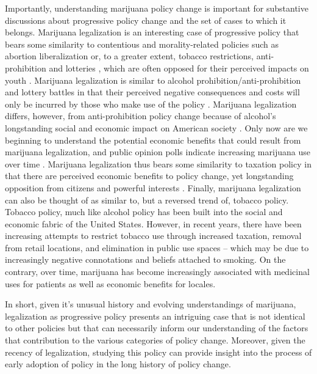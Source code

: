 Importantly, understanding marijuana policy change is important for substantive discussions about progressive policy change and the set of cases to which it belongs. Marijuana legalization is an interesting case of progressive policy that bears some similarity to  contentious and morality-related policies such as abortion liberalization or, to a greater extent, tobacco restrictions, anti-prohibition \citep{gusfield_1963,andrews_and_seguin_2015} and lotteries \citep{pierce_and_miller_1999,berry_and_berry_1990}, which are often opposed for their perceived impacts on youth \citep{beisel_1997}. Marijuana legalization is similar to alcohol prohibition/anti-prohibition and lottery battles in that their perceived negative consequences and costs will only be incurred by those who make use of the policy \citep{mikesell_and_zorn_1986,berry_and_berry_1990}. Marijuana legalization differs, however, from anti-prohibition policy change because of alcohol's longstanding social and economic impact on American society \citep{andrews_and_seguin_2015}. Only now are we beginning to understand the potential economic benefits that could result from marijuana legalization, and public opinion polls indicate increasing marijuana use over time \citep{gallup_2013}. Marijuana legalization thus bears some similarity to taxation policy \citep{amenta_and_halfmann_2000} in that there are perceived economic benefits to policy change, yet longstanding opposition from citizens and powerful interests \citep{amenta_and_elliott_2019}. Finally, marijuana legalization can also be thought of as similar to, but a reversed trend of, tobacco policy. Tobacco policy, much like alcohol policy has been built into the social and economic fabric of the United States. However, in recent years, there have been increasing attempts to restrict tobacco use through increased taxation, removal from retail locations, and elimination in public use spaces -- which may be due to increasingly negative connotations and beliefs attached to smoking. On the contrary, over time, marijuana has become increasingly associated with medicinal uses for patients as well as economic benefits for locales. 

In short, given it's unusual history and evolving understandings of marijuana, legalization as progressive policy presents an intriguing case that is not identical to other policies but that can necessarily inform our understanding of the factors that contribution to the various categories of policy change. Moreover, given the recency of legalization, studying this policy can provide insight into the process of early adoption of policy in the long history of policy change. 

